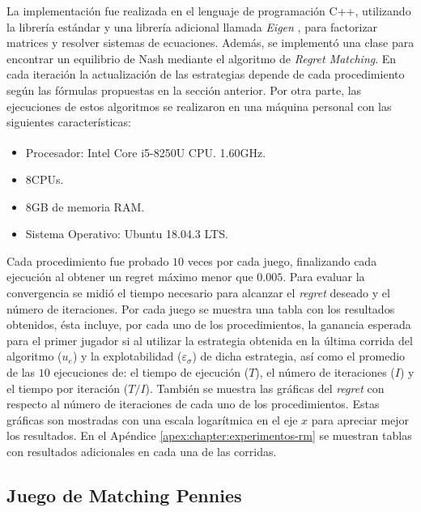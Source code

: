 La implementación fue realizada en el lenguaje de programación C++, utilizando la librería estándar y una librería adicional llamada \textit{Eigen} \cite{bib:eigen}, para factorizar matrices y resolver sistemas de ecuaciones. Además, se implementó una clase para encontrar un equilibrio de Nash mediante el algoritmo de \textit{Regret Matching}. En cada iteración la actualización de las estrategias depende de cada procedimiento según las fórmulas propuestas en la sección anterior. Por otra parte, las ejecuciones de estos algoritmos se realizaron en una máquina personal con las siguientes características: %
\begin{itemize}[noitemsep]
    \item Procesador: Intel\textsuperscript{\textregistered} Core\textsuperscript{\texttrademark} i5-8250U CPU.   1.60GHz.
    \item 8CPUs.
    \item 8GB de memoria RAM.
    \item Sistema Operativo: Ubuntu 18.04.3 LTS.
\end{itemize}

Cada procedimiento fue probado $10$ veces por cada juego, finalizando cada ejecución al obtener un regret máximo menor que $0.005$.  Para evaluar la convergencia se midió el tiempo necesario para alcanzar el \textit{regret} deseado y el número de iteraciones. Por cada juego se muestra una tabla con los resultados obtenidos, ésta incluye, por cada uno de los procedimientos, la ganancia esperada para el primer jugador si al utilizar la estrategia obtenida en la última corrida del algoritmo ($u_e$) y la explotabilidad ($\varepsilon_{\sigma}$) de dicha estrategia, así como el promedio de las $10$ ejecuciones de: el tiempo de ejecución ($T$), el número de iteraciones ($I$) y el tiempo por iteración ($T/I$). También se muestra las gráficas del \textit{regret} con respecto al número de iteraciones de cada uno de los procedimientos. Estas gráficas son mostradas con una escala logarítmica en el eje $x$ para apreciar mejor los resultados. En el Apéndice \ref{apex:chapter:experimentos-rm} se muestran tablas con resultados adicionales en cada una de las corridas.

\subsection*{Juego de Matching Pennies}

